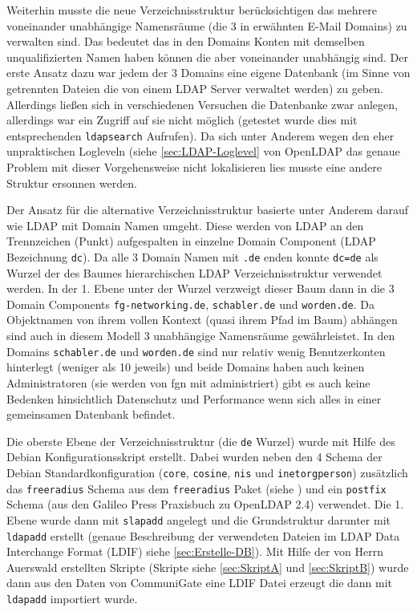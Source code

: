 \documentclass[11pt,a4paper,titlepage=firstiscover]{scrartcl} %
\begin{document}
Weiterhin musste die neue Verzeichnisstruktur ber\"ucksichtigen das mehrere voneinander unabh\"angige Namensr\"aume (die 3 in  erw\"ahnten E-Mail Domains) zu verwalten sind. Das bedeutet das in den Domains Konten mit demselben unqualifizierten Namen haben k\"onnen die aber voneinander unabh\"angig sind. Der erste Ansatz dazu war jedem der 3 Domains eine eigene Datenbank (im Sinne von getrennten Dateien die von einem LDAP Server verwaltet werden) zu geben. Allerdings lie\ss{}en sich in verschiedenen Versuchen die Datenbanke zwar anlegen, allerdings war ein Zugriff auf sie nicht m\"oglich (getestet wurde dies mit entsprechenden \texttt{ldapsearch} Aufrufen). Da sich unter Anderem wegen den eher unpraktischen Logleveln (siehe \autoref{sec:LDAP-Loglevel} von OpenLDAP das genaue Problem mit dieser Vorgehensweise nicht lokalisieren lies musste eine andere Struktur ersonnen werden.

Der Ansatz f\"ur die alternative Verzeichnisstruktur basierte unter Anderem darauf wie LDAP mit Domain Namen umgeht. Diese werden von LDAP an den Trennzeichen (Punkt) aufgespalten in einzelne Domain Component (LDAP Bezeichnung \texttt{dc}). Da alle 3 Domain Namen mit \texttt{.de} enden konnte \texttt{dc=de} als Wurzel der des Baumes hierarchischen LDAP Verzeichnisstruktur verwendet werden. In der 1. Ebene unter der Wurzel verzweigt dieser Baum dann in die 3 Domain Components  \texttt{fg-networking.de}, \texttt{schabler.de} und \texttt{worden.de}. Da Objektnamen von ihrem vollen Kontext (quasi ihrem Pfad im Baum) abh\"angen sind auch in diesem Modell 3 unabh\"angige Namensr\"aume gew\"ahrleistet. In den Domains \texttt{schabler.de} und \texttt{worden.de} sind nur relativ wenig Benutzerkonten hinterlegt (weniger als 10 jeweils) und beide Domains haben auch keinen Administratoren (sie werden von fgn mit administriert) gibt es auch keine Bedenken hinsichtlich Datenschutz und Performance wenn sich alles in einer gemeinsamen Datenbank befindet.

Die oberste Ebene der Verzeichnisstruktur (die \texttt{de} Wurzel) wurde mit Hilfe des Debian Konfigurationsskript erstellt. Dabei wurden neben den 4 Schema der Debian Standardkonfiguration (\texttt{core}, \texttt{cosine}, \texttt{nis} und \texttt{inetorgperson}) zus\"atzlich das \texttt{freeradius} Schema aus dem \texttt{freeradius} Paket (siehe ) und ein \texttt{postfix} Schema (aus den Galileo Press Praxisbuch zu OpenLDAP 2.4) verwendet. Die 1. Ebene wurde dann mit \texttt{slapadd} angelegt und die Grundstruktur darunter mit \texttt{ldapadd} erstellt (genaue Beschreibung der verwendeten Dateien im LDAP Data Interchange Format (LDIF) siehe \autoref{sec:Erstelle-DB}). Mit Hilfe der von Herrn Auerswald erstellten Skripte (Skripte siehe \autoref{sec:SkriptA} und \autoref{sec:SkriptB}) wurde dann aus den Daten von CommuniGate eine LDIF Datei erzeugt die dann mit \texttt{ldapadd} importiert wurde.
\end{document}
